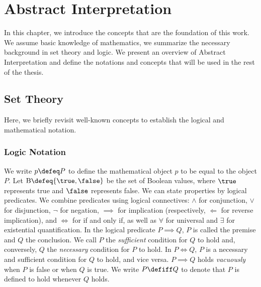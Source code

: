 


\setchapterpreamble[u]{\margintoc}


\chapter{Abstract Interpretation}


\marginemptybox{16cm}

In this chapter, we introduce the concepts that are the foundation of this work.
We assume basic knowledge of mathematics, we summarize the necessary background in set theory and logic.
We present an overview of Abstract Interpretation and define the notations and concepts that will be used in the rest of the thesis.

\section{Set Theory}

Here, we briefly revisit well-known concepts to establish the logical and mathematical notation.

\subsection{Logic Notation}

We write $p \defeq P$ to define the mathematical object $p$ to be equal to the object $P$.
Let $\B \defeq \{\true, \false\}$ be the set of Boolean values, where $\true$ represents true and $\false$ represents false.
We can state properties by logical predicates.
We combine predicates using logical connectives: $\land$ for conjunction, $\lor$ for disjunction, $\neg$ for negation, $\implies$ for implication (respectively, $\Leftarrow$ for reverse implication), and $\iff$ for if and only if, as well as $\forall$ for universal and $\exists$ for existential quantification.
In the logical predicate $P \implies Q$, $P$ is called the premise and $Q$ the conclusion.
We call $P$ the \emph{sufficient} condition for $Q$ to hold and, conversely, $Q$ the \emph{necessary} condition for $P$ to hold.
In $P \iff Q$, $P$ is a necessary and sufficient condition for $Q$ to hold, and vice versa.
$P \implies Q$ holds \emph{vacuously} when $P$ is false or when $Q$ is true.
We write $P \defiff Q$ to denote that $P$ is defined to hold whenever $Q$ holds.

